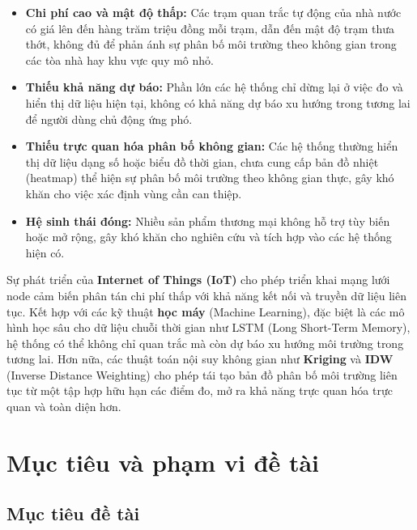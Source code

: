 \begin{itemize}[leftmargin=2cm]
  \item \textbf{Chi phí cao và mật độ thấp:} Các trạm quan trắc tự động
    của nhà nước có giá lên đến hàng trăm triệu đồng mỗi trạm, dẫn đến
    mật độ trạm thưa thớt, không đủ để phản ánh sự phân bố môi trường
    theo không gian trong các tòa nhà hay khu vực quy mô nhỏ.

  \item \textbf{Thiếu khả năng dự báo:} Phần lớn các hệ thống chỉ dừng
    lại ở việc đo và hiển thị dữ liệu hiện tại, không có khả năng dự
    báo xu hướng trong tương lai để người dùng chủ động ứng phó.

  \item \textbf{Thiếu trực quan hóa phân bố không gian:} Các hệ thống
    thường hiển thị dữ liệu dạng số hoặc biểu đồ thời gian, chưa cung
    cấp bản đồ nhiệt (heatmap) thể hiện sự phân bố môi trường theo
    không gian thực, gây khó khăn cho việc xác định vùng cần can thiệp.

  \item \textbf{Hệ sinh thái đóng:} Nhiều sản phẩm thương mại không hỗ
    trợ tùy biến hoặc mở rộng, gây khó khăn cho nghiên cứu và tích hợp
    vào các hệ thống hiện có.
\end{itemize}

Sự phát triển của \textbf{Internet of Things (IoT)} cho phép triển khai
mạng lưới node cảm biến phân tán chi phí thấp với khả năng kết nối và
truyền dữ liệu liên tục. Kết hợp với các kỹ thuật \textbf{học máy}
(Machine Learning), đặc biệt là các mô hình học sâu cho dữ liệu chuỗi
thời gian như LSTM (Long Short-Term Memory), hệ thống có thể không chỉ
quan trắc mà còn dự báo xu hướng môi trường trong tương lai. Hơn nữa,
các thuật toán nội suy không gian như \textbf{Kriging} và \textbf{IDW}
(Inverse Distance Weighting) cho phép tái tạo bản đồ phân bố môi trường
liên tục từ một tập hợp hữu hạn các điểm đo, mở ra khả năng trực quan
hóa trực quan và toàn diện hơn.

\section{Mục tiêu và phạm vi đề tài}
\label{sec:intro:scope}

\subsection{Mục tiêu đề tài}
\label{subsec:intro:objective}

